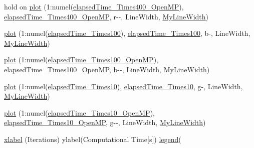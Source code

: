 \begin{DoxyCompactItemize}
\item 
hold on \hyperlink{a00100_a8c0f7bd65e593cfe31ad2a224c8776ce}{plot} (1\+:numel(\hyperlink{a00100_adb44ff1fb324f5ca58520511cca92ed7}{elapsed\+Time\+\_\+Times400\+\_\+\+Open\+M\+P}), \hyperlink{a00100_adb44ff1fb324f5ca58520511cca92ed7}{elapsed\+Time\+\_\+Times400\+\_\+\+Open\+M\+P}, \textquotesingle{}r-\/-\/\textquotesingle{}, \textquotesingle{}Line\+Width\textquotesingle{}, \hyperlink{a00100_a76b83ba444571bd585a06a5e6740202e}{My\+Line\+Width})
\item 
\hyperlink{a00100_a89f0e0f783696278c9b904d8ab9052aa}{plot} (1\+:numel(\hyperlink{a00100_ab5f5a5607349d43d137f2d3d9b6ac81f}{elapsed\+Time\+\_\+Times100}), \hyperlink{a00100_ab5f5a5607349d43d137f2d3d9b6ac81f}{elapsed\+Time\+\_\+Times100}, \textquotesingle{}b-\/\textquotesingle{}, \textquotesingle{}Line\+Width\textquotesingle{}, \hyperlink{a00100_a76b83ba444571bd585a06a5e6740202e}{My\+Line\+Width})
\item 
\hyperlink{a00100_a8e94e8cbeeb84bc0d82c00be8550d327}{plot} (1\+:numel(\hyperlink{a00100_a81a8ed9e2700c8561764b5a0bf578447}{elapsed\+Time\+\_\+Times100\+\_\+\+Open\+M\+P}), \hyperlink{a00100_a81a8ed9e2700c8561764b5a0bf578447}{elapsed\+Time\+\_\+Times100\+\_\+\+Open\+M\+P}, \textquotesingle{}b-\/-\/\textquotesingle{}, \textquotesingle{}Line\+Width\textquotesingle{}, \hyperlink{a00100_a76b83ba444571bd585a06a5e6740202e}{My\+Line\+Width})
\item 
\hyperlink{a00100_a59a6d27a9f99b9a4b296209d6b28c9bd}{plot} (1\+:numel(\hyperlink{a00100_a77a507e5a0b77cdca2f380c2a67dda92}{elapsed\+Time\+\_\+Times10}), \hyperlink{a00100_a77a507e5a0b77cdca2f380c2a67dda92}{elapsed\+Time\+\_\+Times10}, \textquotesingle{}g-\/\textquotesingle{}, \textquotesingle{}Line\+Width\textquotesingle{}, \hyperlink{a00100_a76b83ba444571bd585a06a5e6740202e}{My\+Line\+Width})
\item 
\hyperlink{a00100_af59f78b1aa20523e7fd963af6aba19ac}{plot} (1\+:numel(\hyperlink{a00100_abb7203de0010df4491d1db729b4985ac}{elapsed\+Time\+\_\+Times10\+\_\+\+Open\+M\+P}), \hyperlink{a00100_abb7203de0010df4491d1db729b4985ac}{elapsed\+Time\+\_\+Times10\+\_\+\+Open\+M\+P}, \textquotesingle{}g-\/-\/\textquotesingle{}, \textquotesingle{}Line\+Width\textquotesingle{}, \hyperlink{a00100_a76b83ba444571bd585a06a5e6740202e}{My\+Line\+Width})
\item 
\hyperlink{a00100_a5c84603e3a0c1eaf92f7b50ab7ccf7f2}{xlabel} (\textquotesingle{}Iterations\textquotesingle{}) ylabel(\textquotesingle{}Computational Time\mbox{[}s\mbox{]}\textquotesingle{}) \hyperlink{a00100_a6b5fce02da94e50d48e15f2c186a9525}{legend}(

\end{DoxyCompactItemize}
